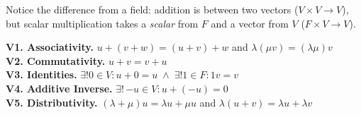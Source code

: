 \documentclass[11pt]{article}
\theoremstyle{definition}
\theoremstyle{plain}
\theoremstyle{remark}
\begin{document}
Notice the difference from a field: addition is between two vectors ($V \times V \to V$), but scalar multiplication takes a \textit{scalar} from $F$ and a vector from $V$ ($F \times V \to V$).

\begin{axiombox}
\textbf{V1. Associativity.} $u + (v + w) = (u + v) + w$ and $\lambda(\mu v) = (\lambda \mu)v$ \\[4pt]
\textbf{V2. Commutativity.} $u + v = v + u$ \\[4pt]
\textbf{V3. Identities.} $\exists! 0 \in V : u + 0 = u \;\wedge\; \exists! 1 \in F : 1v = v$ \\[4pt]
\textbf{V4. Additive Inverse.} $\exists!\, {-u} \in V : u + (-u) = 0$ \\[4pt]
\textbf{V5. Distributivity.} $(\lambda + \mu)u = \lambda u + \mu u$ and $\lambda(u + v) = \lambda u + \lambda v$
\end{axiombox}
\end{document}
